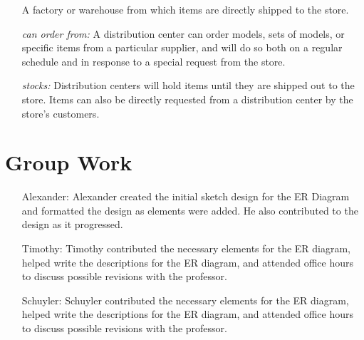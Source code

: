 \documentclass[american,extrafontsizes,12pt,portrait,letterpaper,oneside,onecolumn,article,final]{memoir}
\begin{document}
\begin{enumerate}[leftmargin=*,widest={\strong{Distribution Center:}}]
\item[\strong{\hypertarget{DistributionCenter}{Distribution Center}:}]
%
A factory or warehouse from which items are directly shipped to the store.

\item[\emph{\hypertarget{DistributionCenter-Supplier-rel}{can order from}:}]
%
A distribution center can order models, sets of models, or specific items from a particular supplier, and will do so both on a regular schedule and in response to a special request from the store.

\item[\emph{\hypertarget{DistributionCenter-Item-rel}{stocks}:}]
%
Distribution centers will hold items until they are shipped out to the store.
Items can also be directly requested from a distribution center by the store's customers.

\end{enumerate}

\section*{Group Work}
%
\begin{enumerate}[leftmargin=*,widest={Alexander:}]

\item[Alexander:]
%
Alexander created the initial sketch design for the ER Diagram and formatted the design as elements were added.
He also contributed to the design as it progressed.

\item[Timothy:]
%
Timothy contributed the necessary elements for the ER diagram, helped write the descriptions for the ER diagram, and attended office hours to discuss possible revisions with the professor.

\item[Schuyler:]
%
Schuyler contributed the necessary elements for the ER diagram, helped write the descriptions for the ER diagram, and attended office hours to discuss possible revisions with the professor.

\end{enumerate}
\end{document}
